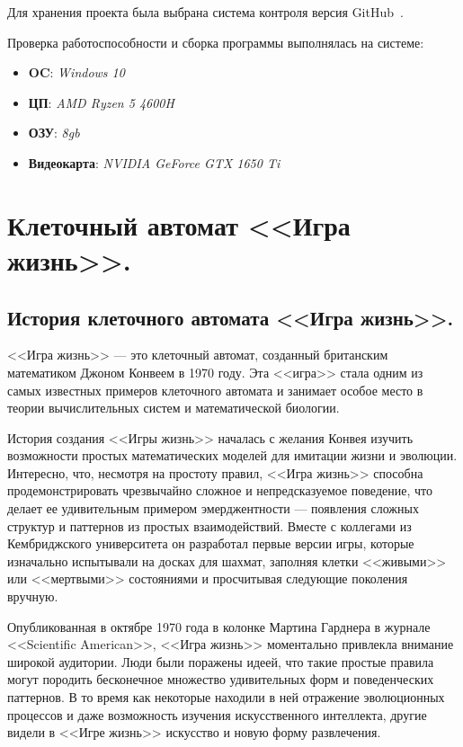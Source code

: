 Для хранения проекта была выбрана система контроля версия GitHub~\cite{wikiRUGitHub}.

Проверка работоспособности и сборка программы выполнялась на системе:
	\begin{itemize}
		\item \textbf{OC}: \textit{Windows 10}
		\item \textbf{ЦП}: \textit{AMD Ryzen 5 4600H}
		\item \textbf{ОЗУ}: \textit{8gb}
		\item \textbf{Видеокарта}: \textit{NVIDIA GeForce GTX 1650 Ti}
	\end{itemize}

\section{\label{sec:ch01/sec04}Клеточный автомат <<Игра жизнь>>.}
\subsection{\label{subsec:ch01/sec04/subsec01}История клеточного автомата <<Игра жизнь>>.}

<<Игра жизнь>> — это клеточный автомат, созданный британским математиком Джоном Конвеем в 1970 году. Эта <<игра>> стала одним из самых известных примеров клеточного автомата и занимает особое место в теории вычислительных систем и математической биологии.

История создания <<Игры жизнь>> началась с желания Конвея изучить возможности простых математических моделей для имитации жизни и эволюции. Интересно, что, несмотря на простоту правил, <<Игра жизнь>> способна продемонстрировать чрезвычайно сложное и непредсказуемое поведение, что делает ее удивительным примером эмерджентности — появления сложных структур и паттернов из простых взаимодействий. Вместе с коллегами из Кембриджского университета он разработал первые версии игры, которые изначально испытывали на досках для шахмат, заполняя клетки <<живыми>> или <<мертвыми>> состояниями и просчитывая следующие поколения вручную.

Опубликованная в октябре 1970 года в колонке Мартина Гарднера в журнале <<Scientific American>>, <<Игра жизнь>> моментально привлекла внимание широкой аудитории. Люди были поражены идеей, что такие простые правила могут породить бесконечное множество удивительных форм и поведенческих паттернов. В то время как некоторые находили в ней отражение эволюционных процессов и даже возможность изучения искусственного интеллекта, другие видели в <<Игре жизнь>> искусство и новую форму развлечения.

